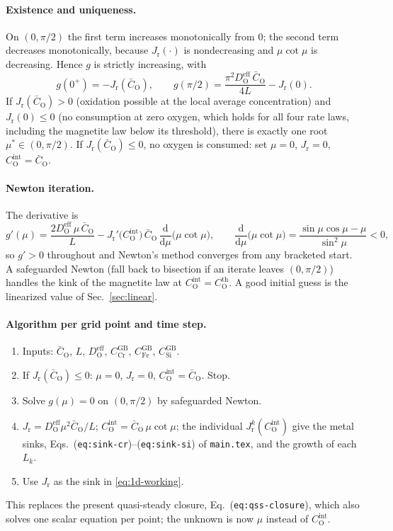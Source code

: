 \documentclass[12pt]{article}
\newcommand{\GB}{\mathrm{GB}}
\newcommand{\eff}{\mathrm{eff}}
\newcommand{\intf}{\mathrm{int}}
\newcommand{\Ox}{\mathrm{O}}
\newcommand{\D}{D_{\Ox}^{\eff}}
\newcommand{\Cb}{\bar{C}_{\Ox}}
\newcommand{\Ci}{C_{\Ox}^{\intf}}
\newcommand{\Jr}{J_{\mathrm{r}}}
\newcommand{\dd}{\mathrm{d}}
\begin{document}
\paragraph{Existence and uniqueness.} On $(0,\pi/2)$ the first term increases
monotonically from $0$; the second term decreases monotonically, because $\Jr(\cdot)$ is
nondecreasing and $\mu\cot\mu$ is decreasing. Hence $g$ is strictly increasing, with
\begin{equation}
g(0^+)=-\Jr(\Cb),
\qquad
g(\pi/2)=\frac{\pi^2\D\,\Cb}{4L}-\Jr(0).
\end{equation}
If $\Jr(\Cb)>0$ (oxidation possible at the local average concentration) and
$\Jr(0)\le0$ (no consumption at zero oxygen, which holds for all four rate laws,
including the magnetite law below its threshold), there is exactly one root
$\mu^\ast\in(0,\pi/2)$. If $\Jr(\Cb)\le0$, no oxygen is consumed: set $\mu=0$,
$\Jr=0$, $\Ci=\Cb$.

\paragraph{Newton iteration.} The derivative is
\begin{equation}
g'(\mu)=\frac{2\D\,\mu\,\Cb}{L}
        -\Jr'\bigl(\Ci\bigr)\,\Cb\,\frac{\dd}{\dd\mu}\bigl(\mu\cot\mu\bigr),
\qquad
\frac{\dd}{\dd\mu}\bigl(\mu\cot\mu\bigr)=\frac{\sin\mu\cos\mu-\mu}{\sin^2\mu}<0,
\end{equation}
so $g'>0$ throughout and Newton's method converges from any bracketed start. A
safeguarded Newton (fall back to bisection if an iterate leaves $(0,\pi/2)$) handles
the kink of the magnetite law at $\Ci=C_{\Ox}^{\mathrm{th}}$. A good initial guess is
the linearized value of Sec.~\ref{sec:linear}.

\paragraph{Algorithm per grid point and time step.}
\begin{enumerate}
  \item Inputs: $\Cb$, $L$, $\D$, $C_{\mathrm{Cr}}^{\GB}$, $C_{\mathrm{Fe}}^{\GB}$,
        $C_{\mathrm{Si}}^{\GB}$.
  \item If $\Jr(\Cb)\le0$: $\mu=0$, $\Jr=0$, $\Ci=\Cb$. Stop.
  \item Solve $g(\mu)=0$ on $(0,\pi/2)$ by safeguarded Newton.
  \item $\Jr=\D\mu^2\Cb/L$; $\Ci=\Cb\,\mu\cot\mu$; the individual $\Jr^{k}(\Ci)$
        give the metal sinks, Eqs.~(\texttt{eq:sink-cr})--(\texttt{eq:sink-si}) of
        \texttt{main.tex}, and the growth of each $L_k$.
  \item Use $\Jr$ as the sink in \eqref{eq:1d-working}.
\end{enumerate}
This replaces the present quasi-steady closure, Eq.~(\texttt{eq:qss-closure}), which
also solves one scalar equation per point; the unknown is now $\mu$ instead of $\Ci$.
\end{document}
